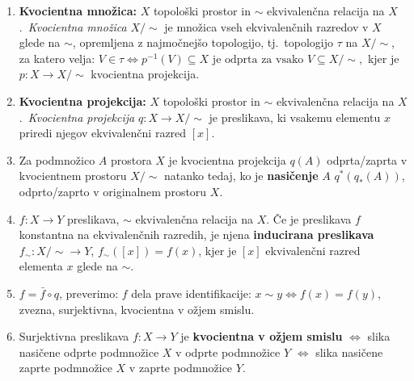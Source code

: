 \documentclass[10pt,a4paper]{article}
\begin{document}
\begin{enumerate}
    \setlength\itemsep{1px}%
    
\item \textbf{Kvocientna množica:}  \(X\) topološki prostor in \(\sim\)
    ekvivalenčna relacija na \(X\).~\textit{Kvocientna množica} \(X/{\sim}\) je množica
    vseh ekvivalenčnih razredov v \(X\) glede na \(\sim\), opremljena z najmočnejšo
    topologijo, tj.~topologijo \(\tau\) na \(X/{\sim}\), za katero velja:
    $ V \in \tau \iff p^{-1}(V) \subseteq X \text{ je odprta za vsako } V
    \subseteq X/{\sim}, $ kjer je \(p: X \rightarrow X/{\sim}\) kvocientna projekcija.
    
\item \textbf{Kvocientna projekcija:}  \(X\) topološki prostor in \(\sim\)
    ekvivalenčna relacija na \(X\).~\textit{Kvocientna projekcija}
    \(q: X \rightarrow X/{\sim}\) je preslikava, ki vsakemu elementu \(x\) priredi
    njegov ekvivalenčni razred \([x]\).
    
\item Za podmnožico \(A\) prostora \(X\) je kvocientna projekcija \(q(A)\)
    odprta/zaprta v kvocientnem prostoru \(X/{\sim}\) natanko tedaj, ko je \textbf{nasičenje}
    \(A\) \(q^{*}(q_*(A))\), odprto/zaprto v originalnem prostoru \(X\).

\item \(f: X \rightarrow Y\) preslikava, \(\sim\) ekvivalenčna relacija na \(X\).
    Če je preslikava $f$ konstantna na ekvivalenčnih razredih, je njena \textbf{inducirana preslikava} 
		\(f_{\sim}: X/{\sim} \rightarrow Y\), \(f_{\sim}([x]) = f(x)\), kjer je \([x]\)
    ekvivalenčni razred elementa \(x\) glede na \(\sim\).
    
\item $f = \bar{f} \circ q $, preverimo: $f$ dela prave identifikacije:
    $x \sim y \Leftrightarrow f(x) = f(y)$, zvezna, surjektivna,
    kvocientna v ožjem smislu.
    
\item Surjektivna preslikava $f: X \rightarrow Y$ je \textbf{kvocientna v ožjem smislu}
    $\Leftrightarrow$ slika nasičene odprte podmnožice $X$ v odprte podmnožice $Y$
    $\Leftrightarrow$ slika nasičene zaprte podmnožice $X$ v zaprte podmnožice $Y$.
    

\end{enumerate}
\end{document}
